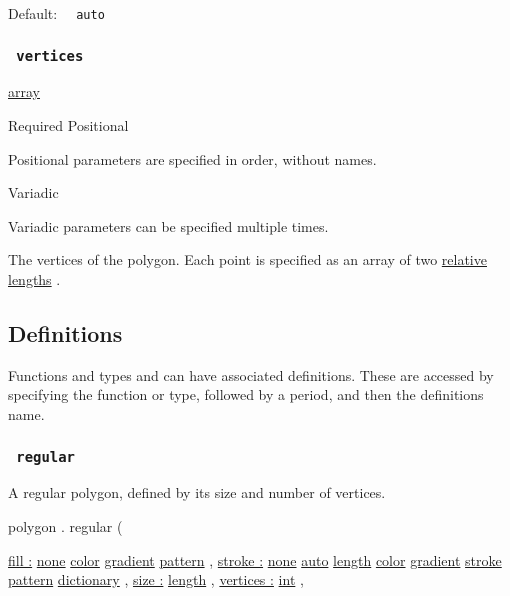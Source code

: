 Default: \texttt{\ }{\texttt{\ auto\ }}\texttt{\ }

\subsubsection{\texorpdfstring{\texttt{\ vertices\ }}{ vertices }}\label{parameters-vertices}

\href{/docs/reference/foundations/array/}{array}

{Required} {{ Positional }}

\label{parameters-vertices-positional-tooltip}
Positional parameters are specified in order, without names.

{{ Variadic }}

\label{parameters-vertices-variadic-tooltip}
Variadic parameters can be specified multiple times.

The vertices of the polygon. Each point is specified as an array of two
\href{/docs/reference/layout/relative/}{relative lengths} .

\subsection{\texorpdfstring{{ Definitions
}}{ Definitions }}\label{definitions}

\label{definitions-tooltip}
Functions and types and can have associated definitions. These are
accessed by specifying the function or type, followed by a period, and
then the definition\textquotesingle s name.

\subsubsection{\texorpdfstring{\texttt{\ regular\ }}{ regular }}\label{definitions-regular}

A regular polygon, defined by its size and number of vertices.

polygon { . } { regular } (

{ \hyperref[definitions-regular-parameters-fill]{fill :}
\href{/docs/reference/foundations/none/}{none}
\href{/docs/reference/visualize/color/}{color}
\href{/docs/reference/visualize/gradient/}{gradient}
\href{/docs/reference/visualize/pattern/}{pattern} , } {
\hyperref[definitions-regular-parameters-stroke]{stroke :}
\href{/docs/reference/foundations/none/}{none}
\href{/docs/reference/foundations/auto/}{auto}
\href{/docs/reference/layout/length/}{length}
\href{/docs/reference/visualize/color/}{color}
\href{/docs/reference/visualize/gradient/}{gradient}
\href{/docs/reference/visualize/stroke/}{stroke}
\href{/docs/reference/visualize/pattern/}{pattern}
\href{/docs/reference/foundations/dictionary/}{dictionary} , } {
\hyperref[definitions-regular-parameters-size]{size :}
\href{/docs/reference/layout/length/}{length} , } {
\hyperref[definitions-regular-parameters-vertices]{vertices :}
\href{/docs/reference/foundations/int/}{int} , }

